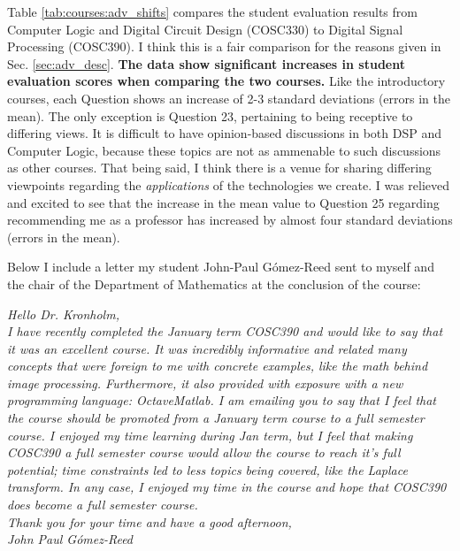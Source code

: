 \documentclass[../../main.tex]{subfiles}
\begin{document}
Table \ref{tab:courses:adv_shifts} compares the student evaluation results from Computer Logic and Digital Circuit Design (COSC330) to Digital Signal Processing (COSC390).  I think this is a fair comparison for the reasons given in Sec. \ref{sec:adv_desc}.  \textbf{The data show significant increases in student evaluation scores when comparing the two courses.}  Like the introductory courses, each Question shows an increase of 2-3 standard deviations (errors in the mean).  The only exception is Question 23, pertaining to being receptive to differing views.  It is difficult to have opinion-based discussions in both DSP and Computer Logic, because these topics are not as ammenable to such discussions as other courses.  That being said, I think there is a venue for sharing differing viewpoints regarding the \textit{applications} of the technologies we create.  I was relieved and excited to see that the increase in the mean value to Question 25 regarding recommending me as a professor has increased by almost four standard deviations (errors in the mean). \\ \hspace{0.1cm}

Below I include a letter my student John-Paul G\'{o}mez-Reed sent to myself and the chair of the Department of Mathematics at the conclusion of the course: \\ \hspace{0.1cm}

\textit{Hello Dr. Kronholm, \\ \vspace{0.5cm} I have recently completed the January term COSC390 and would like to say that it was an excellent course. It was incredibly informative and related many concepts that were foreign to me with concrete examples, like the math behind image processing.  Furthermore, it also provided with exposure with a new programming language: Octave\/Matlab.  I am emailing you to say that I feel that the course should be promoted from a January term course to a full semester course.  I enjoyed my time learning during Jan term, but I feel that making COSC390 a full semester course would allow the course to reach it's full potential; time constraints led to less topics being covered, like the Laplace transform.  In any case, I enjoyed my time in the course and hope that COSC390 does become a full semester course. \\ \vspace{0.5cm} Thank you for your time and have a good afternoon, \\ John Paul G\'omez-Reed}
\end{document}
